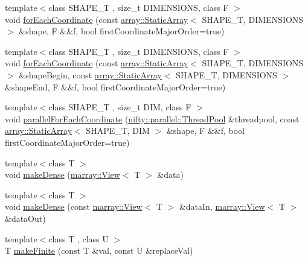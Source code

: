 \begin{DoxyCompactItemize}
\item 
{\footnotesize template$<$class S\+H\+A\+P\+E\+\_\+T , size\+\_\+t D\+I\+M\+E\+N\+S\+I\+O\+NS, class F $>$ }\\void \hyperlink{namespacenifty_1_1tools_a81df2669bba7acc0ad9a253669a28ba4}{for\+Each\+Coordinate} (const \hyperlink{namespacenifty_1_1array_a683f151f19c851754e0c6d55ed16a0c2}{array\+::\+Static\+Array}$<$ S\+H\+A\+P\+E\+\_\+T, D\+I\+M\+E\+N\+S\+I\+O\+NS $>$ \&shape, F \&\&f, bool first\+Coordinate\+Major\+Order=true)
\item 
{\footnotesize template$<$class S\+H\+A\+P\+E\+\_\+T , size\+\_\+t D\+I\+M\+E\+N\+S\+I\+O\+NS, class F $>$ }\\void \hyperlink{namespacenifty_1_1tools_a757aec65ec994397f40a807952edd219}{for\+Each\+Coordinate} (const \hyperlink{namespacenifty_1_1array_a683f151f19c851754e0c6d55ed16a0c2}{array\+::\+Static\+Array}$<$ S\+H\+A\+P\+E\+\_\+T, D\+I\+M\+E\+N\+S\+I\+O\+NS $>$ \&shape\+Begin, const \hyperlink{namespacenifty_1_1array_a683f151f19c851754e0c6d55ed16a0c2}{array\+::\+Static\+Array}$<$ S\+H\+A\+P\+E\+\_\+T, D\+I\+M\+E\+N\+S\+I\+O\+NS $>$ \&shape\+End, F \&\&f, bool first\+Coordinate\+Major\+Order=true)
\item 
{\footnotesize template$<$class S\+H\+A\+P\+E\+\_\+T , size\+\_\+t D\+IM, class F $>$ }\\void \hyperlink{namespacenifty_1_1tools_a34595523082dffa3f21d4b40cc13cfae}{parallel\+For\+Each\+Coordinate} (\hyperlink{classnifty_1_1parallel_1_1ThreadPool}{nifty\+::parallel\+::\+Thread\+Pool} \&threadpool, const \hyperlink{namespacenifty_1_1array_a683f151f19c851754e0c6d55ed16a0c2}{array\+::\+Static\+Array}$<$ S\+H\+A\+P\+E\+\_\+T, D\+IM $>$ \&shape, F \&\&f, bool first\+Coordinate\+Major\+Order=true)
\item 
{\footnotesize template$<$class T $>$ }\\void \hyperlink{namespacenifty_1_1tools_a2c8c36d25cd0360146bec83f981de045}{make\+Dense} (\hyperlink{classandres_1_1View}{marray\+::\+View}$<$ T $>$ \&data)
\item 
{\footnotesize template$<$class T $>$ }\\void \hyperlink{namespacenifty_1_1tools_a0fba3a0bb159e35a054e7ea8f258c4c3}{make\+Dense} (const \hyperlink{classandres_1_1View}{marray\+::\+View}$<$ T $>$ \&data\+In, \hyperlink{classandres_1_1View}{marray\+::\+View}$<$ T $>$ \&data\+Out)
\item 
{\footnotesize template$<$class T , class U $>$ }\\T \hyperlink{namespacenifty_1_1tools_abefcf35b4e6658bb8179a41a2de97d9e}{make\+Finite} (const T \&val, const U \&replace\+Val)
\end{DoxyCompactItemize}


